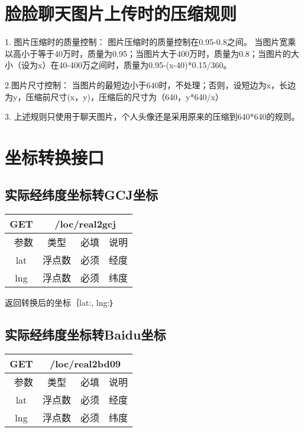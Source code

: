 \documentclass[cs4size]{ctexartutf8}
\begin{document}
\section{脸脸聊天图片上传时的压缩规则}

1. 图片压缩时的质量控制：
图片压缩时的质量控制在0.95-0.8之间。
当图片宽乘以高小于等于40万时，质量为0.95；当图片大于400万时，质量为0.8；当图片的大小（设为x）在40-400万之间时，质量为0.95-(x-40)*0.15/360。

2.图片尺寸控制：
当图片的最短边小于640时，不处理；否则，设短边为x，长边为y，压缩前尺寸(x，y)，压缩后的尺寸为（640，y*640/x）

3. 上述规则只使用于聊天图片，个人头像还是采用原来的压缩到640*640的规则。


\section{坐标转换接口}

\subsection{实际经纬度坐标转GCJ坐标}

\begin{table}[H]
   \begin{center}
\begin{tabular}{|c|c|c|p{12cm}|}
\hline
GET & \multicolumn{3}{|c|}{/loc/real2gcj} \\
\hline\hline
 \  参数  & 类型 & 必填 &  说明  \\
\hline
 lat  & 浮点数 & 必须 & 经度\\
\hline
 lng  &  浮点数 & 必须 & 纬度\\ 
\hline
\end{tabular}
   \end{center}
\end{table}

返回转换后的坐标｛lat:, lng:｝

\subsection{实际经纬度坐标转Baidu坐标}

\begin{table}[H]
   \begin{center}
\begin{tabular}{|c|c|c|p{12cm}|}
\hline
GET & \multicolumn{3}{|c|}{/loc/real2bd09} \\
\hline\hline
 \  参数  & 类型 & 必填 &  说明  \\
\hline
 lat  & 浮点数 & 必须 & 经度\\
\hline
 lng  &  浮点数 & 必须 & 纬度\\ 
\hline
\end{tabular}
   \end{center}
\end{table}
\end{document}
